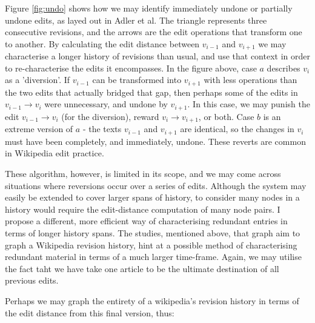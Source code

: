 \documentclass[a4paper,11pt,twoside,notitlepage]{article}
\begin{document}
        Figure \ref{fig:undo} shows how we may identify immediately
        undone or partially undone edits, as layed out in Adler et
        al.\cite{Adler2007} The triangle represents three consecutive
        revisions, and the arrows are the edit operations that
        transform one to another. By calculating the edit distance
        between $v_{i-1}$ and $v_{i+1}$ we may characterise a longer
        history of revisions than usual, and use that context in order
        to re-characterise the edits it encompasses. In the figure
        above, case $a$ describes $v_i$ as a 'diversion'. If $v_{i-1}$
        can be transformed into $v_{i+1}$ with less operations than
        the two edits that actually bridged that gap, then perhaps
        some of the edits in $v_{i-1} \rightarrow v_i$ were
        unnecessary, and undone by $v_{i+1}$. In this case, we may
          punish the edit $v_{i-1} \rightarrow v_i$ (for the
          diversion), reward $v_{i} \rightarrow v_{i+1}$, or
          both. Case $b$ is an extreme version of $a$ - the texts
          $v_{i-1}$ and $v_{i+1}$ are identical, so the changes in
            $v_i$ must have been completely, and immediately,
            undone. These reverts are common in Wikipedia edit
            practice.\cite{wiki-revert}

        These algorithm, however, is limited in its scope, and we may
        come across situations where reversions occur over a series of
        edits. Although the system may easily be extended to cover
        larger spans of history, to consider many nodes in a history
        would require the edit-distance computation of many node
        pairs. I propose a different, more efficient way of
        characterising redundant entries in terms of longer history
        spans. The studies, mentioned above, that graph aim to graph a
        Wikipedia revision history, hint at a possible method of
        characterising redundant material in terms of a much larger
        time-frame. Again, we may utilise the fact taht we have take
        one article to be the ultimate destination of all previous
        edits.

        Perhaps we may graph the entirety of a wikipedia's revision
        history in terms of the edit distance from this final version,
        thus:

        \begin{center}
          \pgfplotsset{width=0.4\textwidth}
          \label{fig:dummy_history}
        \end{center}
        
\end{document}
